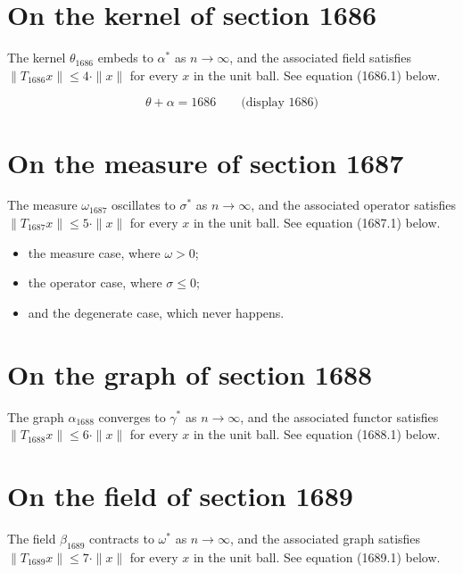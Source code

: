 \documentclass{article}
\begin{document}
\section{On the kernel of section 1686}
The kernel $\theta_{1686}$ embeds to $\alpha^{*}$ as $n \to \infty$,
and the associated field satisfies $\|T_{1686} x\| \leq 4 \cdot \|x\|$
for every $x$ in the unit ball. See equation (1686.1) below.

$$
\theta + \alpha = 1686 \qquad \text{(display 1686)}
$$

\section{On the measure of section 1687}
The measure $\omega_{1687}$ oscillates to $\sigma^{*}$ as $n \to \infty$,
and the associated operator satisfies $\|T_{1687} x\| \leq 5 \cdot \|x\|$
for every $x$ in the unit ball. See equation (1687.1) below.

\begin{itemize}
  \item the measure case, where $\omega > 0$;
  \item the operator case, where $\sigma \leq 0$;
  \item and the degenerate case, which never happens.
\end{itemize}

\section{On the graph of section 1688}
The graph $\alpha_{1688}$ converges to $\gamma^{*}$ as $n \to \infty$,
and the associated functor satisfies $\|T_{1688} x\| \leq 6 \cdot \|x\|$
for every $x$ in the unit ball. See equation (1688.1) below.

\section{On the field of section 1689}
The field $\beta_{1689}$ contracts to $\omega^{*}$ as $n \to \infty$,
and the associated graph satisfies $\|T_{1689} x\| \leq 7 \cdot \|x\|$
for every $x$ in the unit ball. See equation (1689.1) below.
\end{document}
